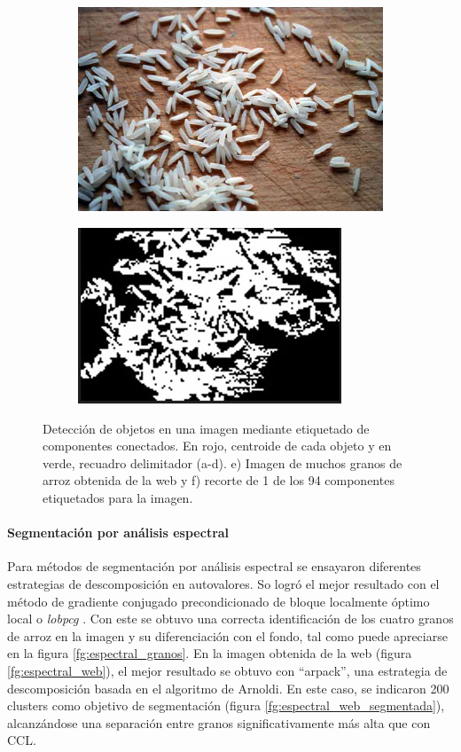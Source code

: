 \documentclass{article}
\begin{document}
\begin{figure} [!htb]
\begin{subfigure}[b]{0.2\textwidth}
        \caption{}
	\end{subfigure}
      \begin{subfigure}[b]{0.2\textwidth}
		\includegraphics[width= \textwidth,height= 2.5 cm]{fg/muchos_basmati.jpg}
        \caption{}
        \label{fg:ccl_web}
	\end{subfigure}
     \begin{subfigure}[b]{0.2\textwidth}
		\includegraphics[width= \textwidth,height= 2.5 cm]{fg/ccl_muchos_basmati.jpg}
        \caption{}
        \label{fg:ccl_web_separada}
	\end{subfigure}
	\caption{Detección de objetos en una imagen mediante etiquetado de componentes conectados. En rojo, centroide de cada objeto y en verde, recuadro delimitador (a-d). e) Imagen de muchos granos de arroz obtenida de la web y f) recorte de 1 de los 94 componentes etiquetados para la imagen.}	
\label{fg:ccl}
\end{figure}


\paragraph{Segmentación por análisis espectral}

Para métodos de segmentación por análisis espectral se ensayaron diferentes estrategias de descomposición en autovalores.
So logró el mejor resultado con el método de gradiente conjugado precondicionado de bloque localmente óptimo local o \textit{lobpcg} \cite{knyazev_toward_2001}.
Con este se obtuvo una correcta identificación de los cuatro granos de arroz en la imagen y su diferenciación con el fondo, tal como puede apreciarse en la figura \ref{fg:espectral_granos}.
En la imagen obtenida de la web (figura \ref{fg:espectral_web}), el mejor resultado se obtuvo con ``arpack'', una estrategia de descomposición basada en el algoritmo de Arnoldi.
En este caso, se indicaron 200 clusters como objetivo de segmentación (figura \ref{fg:espectral_web_segmentada}), alcanzándose una separación entre granos significativamente más alta que con CCL.
\end{document}

